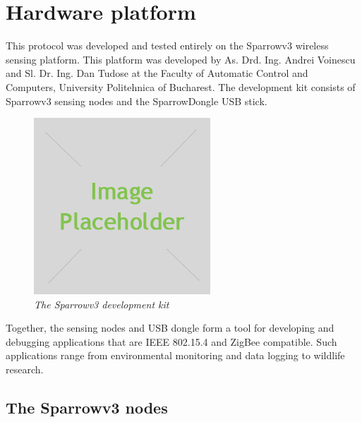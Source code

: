
\chapter{Hardware platform}

This protocol was developed and tested entirely on the Sparrowv3 wireless
sensing platform. This platform was developed by As. Drd. Ing. Andrei Voinescu
and Sl. Dr. Ing. Dan Tudose at the Faculty of Automatic Control and Computers,
University Politehnica of Bucharest. The development kit consists of Sparrowv3
sensing nodes and the SparrowDongle USB stick.

\begin{figure}[ht]
	\begin{center}
		\includegraphics[width=\textwidth]{img/placeholder.jpg}
	\end{center}
	\caption{\small \itshape{The Sparrowv3 development kit}}
\end{figure}

Together, the sensing nodes and USB dongle form a tool for developing and
debugging applications that are IEEE 802.15.4 and ZigBee compatible. Such
applications range from environmental monitoring and data logging to wildlife
research.

\section{The Sparrowv3 nodes}

